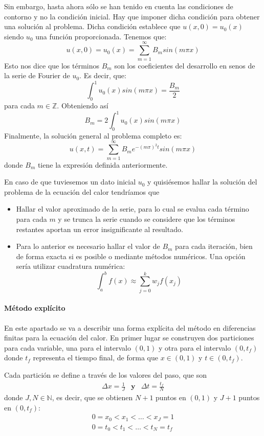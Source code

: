 Sin embargo, hasta ahora sólo se han tenido en cuenta las condiciones de contorno y no la condición inicial. Hay que imponer dicha condición para obtener una solución al problema. Dicha condición establece que $u(x,0) = u_0(x)$ siendo $u_0$ una función proporcionada.
Tenemos que:
$$u(x,0) = u_0(x) = \sum_{m=1}^\infty B_m sin(m\pi x)$$
Esto nos dice que los términos $B_m$ son los coeficientes del desarrollo en senos de la serie de Fourier de $u_0$.
Es decir, que:
$$\int_0^1 u_0(x) sin(m\pi x) = \frac{B_m}{2}$$ para cada $m\in\mathbb{Z}$. Obteniendo así $$B_m = 2\int_0^1 u_0(x) sin(m\pi x)$$
Finalmente, la solución general al problema completo es:
$$u(x,t) = \sum_{m=1}^\infty B_m e^{-(m\pi)^2 t} sin(m\pi x)$$ donde $B_m$ tiene la expresión definida anteriormente.

En caso de que tuviesemos un dato inicial $u_0$ y quisiésemos hallar la solución del problema de la ecuación del calor tendríamos que

\begin{itemize}
	\item Hallar el valor aproximado de la serie, para lo cual se evalua cada término para cada $m$ y se trunca la serie cuando se considere que los términos restantes aportan un error insignificante al resultado.
	\item Para lo anterior es necesario hallar el valor de $B_m$ para cada iteración, bien de forma exacta si es posible o mediante métodos numéricos. Una opción sería utilizar cuadratura numérica:
	$$\int_a^b f(x) \approx \sum_{j=0}^k w_j f(x_j)$$
\end{itemize}

\paragraph{Método explícito}\mbox{}

En este apartado se va a describir una forma explícita del método en diferencias finitas para la ecuación del calor. En primer lugar se construyen dos particiones para cada variable, una para el intervalo $(0,1)$ y otra para el intervalo $(0,t_f)$ donde $t_f$ representa el tiempo final, de forma que $x\in(0,1)$ y $t\in(0,t_f)$.

Cada partición se define a través de los valores del paso, que son
\begin{equation*}
	\begin{array}{lll}
		\Delta x = \frac{1}{J}& \textbf{y} & \Delta t = \frac{t_f}{N}
	\end{array}
\end{equation*}
donde $J,N\in\mathbb{N}$, es decir, que se obtienen $N+1$ puntos en $(0,1)$ y $J+1$ puntos en $(0,t_f)$:
\begin{align*}
0=x_0<x_1<\hdots<x_J = 1\\
0=t_0<t_1<\hdots<t_N = t_f
\end{align*}

